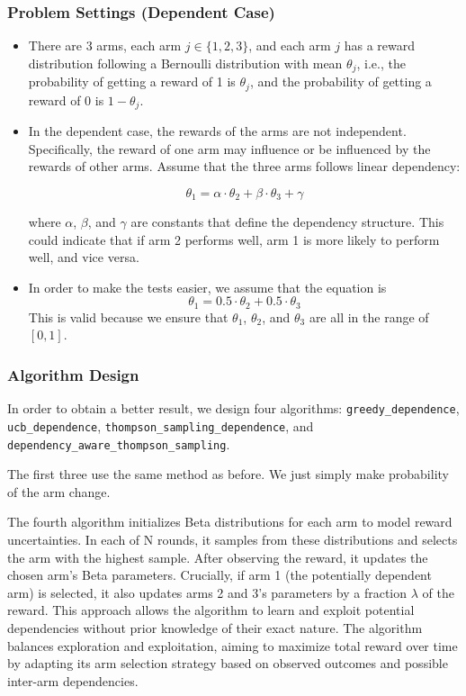 \documentclass[11pt]{article}
\begin{document}
\subsubsection*{Problem Settings (Dependent Case)}

\begin{itemize}
    \item There are 3 arms, each arm $j \in \{1, 2, 3\}$, and each arm $j$ has a reward distribution following a Bernoulli distribution with mean $\theta_j$, i.e., the probability of getting a reward of 1 is $\theta_j$, and the probability of getting a reward of 0 is $1 - \theta_j$.
    
    \item In the dependent case, the rewards of the arms are not independent. Specifically, the reward of one arm may influence or be influenced by the rewards of other arms. Assume that the three arms follows linear dependency: 
    
    \[ \theta_1 = \alpha \cdot \theta_2 + \beta \cdot \theta_3 + \gamma \]
    
    where $\alpha$, $\beta$, and $\gamma$ are constants that define the dependency structure. This could indicate that if arm 2 performs well, arm 1 is more likely to perform well, and vice versa.

    \item In order to make the tests easier, we assume that the equation is \[ \theta_1 = 0.5 \cdot \theta_2 + 0.5 \cdot \theta_3\]
    This is valid because we ensure that $\theta_1$, $\theta_2$, and $\theta_3$ are all in the range of $[0, 1]$.
\end{itemize}

\subsubsection*{Algorithm Design}
In order to obtain a better result, we design four algorithms: \texttt{greedy\_dependence}, \texttt{ucb\_dependence}, \texttt{thompson\_sampling\_dependence}, and \texttt{dependency\_aware\_thompson\_sampling}.

The first three use the same method as before. We just simply make probability of the arm change.

The fourth algorithm initializes Beta distributions for each arm to model reward uncertainties. In each of N rounds, it samples from these distributions and selects the arm with the highest sample. After observing the reward, it updates the chosen arm's Beta parameters. Crucially, if arm 1 (the potentially dependent arm) is selected, it also updates arms 2 and 3's parameters by a fraction $\lambda$ of the reward. This approach allows the algorithm to learn and exploit potential dependencies without prior knowledge of their exact nature. The algorithm balances exploration and exploitation, aiming to maximize total reward over time by adapting its arm selection strategy based on observed outcomes and possible inter-arm dependencies.
\end{document}
